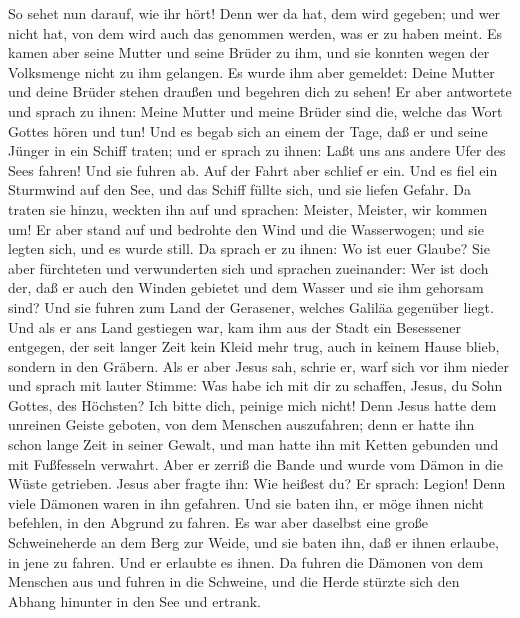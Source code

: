  So sehet nun darauf, wie ihr hört! Denn wer da hat, dem
wird gegeben; und wer nicht hat, von dem wird auch das genommen werden,
was er zu haben meint.  Es kamen aber seine Mutter und
seine Brüder zu ihm, und sie konnten wegen der Volksmenge nicht zu ihm
gelangen.  Es wurde ihm aber gemeldet: Deine Mutter und
deine Brüder stehen draußen und begehren dich zu sehen! 
Er aber antwortete und sprach zu ihnen: Meine Mutter und meine Brüder
sind die, welche das Wort Gottes hören und tun!  Und es
begab sich an einem der Tage, daß er und seine Jünger in ein Schiff
traten; und er sprach zu ihnen: Laßt uns ans andere Ufer des Sees
fahren!  Und sie fuhren ab. Auf der Fahrt aber schlief er
ein. Und es fiel ein Sturmwind auf den See, und das Schiff füllte sich,
und sie liefen Gefahr.  Da traten sie hinzu, weckten ihn
auf und sprachen: Meister, Meister, wir kommen um! Er aber stand auf und
bedrohte den Wind und die Wasserwogen; und sie legten sich, und es wurde
still.  Da sprach er zu ihnen: Wo ist euer Glaube? Sie
aber fürchteten und verwunderten sich und sprachen zueinander: Wer ist
doch der, daß er auch den Winden gebietet und dem Wasser und sie ihm
gehorsam sind?  Und sie fuhren zum Land der Gerasener,
welches Galiläa gegenüber liegt.  Und als er ans Land
gestiegen war, kam ihm aus der Stadt ein Besessener entgegen, der seit
langer Zeit kein Kleid mehr trug, auch in keinem Hause blieb, sondern in
den Gräbern.  Als er aber Jesus sah, schrie er, warf sich
vor ihm nieder und sprach mit lauter Stimme: Was habe ich mit dir zu
schaffen, Jesus, du Sohn Gottes, des Höchsten? Ich bitte dich, peinige
mich nicht!  Denn Jesus hatte dem unreinen Geiste
geboten, von dem Menschen auszufahren; denn er hatte ihn schon lange
Zeit in seiner Gewalt, und man hatte ihn mit Ketten gebunden und mit
Fußfesseln verwahrt. Aber er zerriß die Bande und wurde vom Dämon in die
Wüste getrieben.  Jesus aber fragte ihn: Wie heißest du?
Er sprach: Legion! Denn viele Dämonen waren in ihn gefahren.
 Und sie baten ihn, er möge ihnen nicht befehlen, in den
Abgrund zu fahren.  Es war aber daselbst eine große
Schweineherde an dem Berg zur Weide, und sie baten ihn, daß er ihnen
erlaube, in jene zu fahren. Und er erlaubte es ihnen.  Da
fuhren die Dämonen von dem Menschen aus und fuhren in die Schweine, und
die Herde stürzte sich den Abhang hinunter in den See und ertrank.
